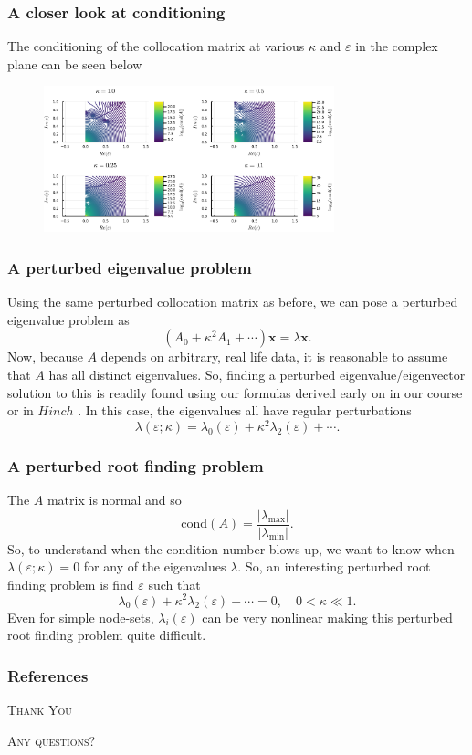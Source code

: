 \documentclass{cubeamer}
\newcommand{\eps}{\varepsilon}
\newcommand{\abs}[1]{\left| #1 \right|}
\begin{document}
\begin{frame}
	\frametitle{A closer look at conditioning}
	The conditioning of the collocation matrix at various $ \kappa $ and $ \eps $ in the complex plane can be seen below
	\begin{figure}
		\includegraphics[width = 0.75\textwidth]{Images/Conditioning.png}
	\end{figure}
\end{frame}

\begin{frame}
	\frametitle{A perturbed eigenvalue problem}
	Using the same perturbed collocation matrix as before, we can pose a perturbed eigenvalue problem as
	\[
		(A_0 + \kappa^2 A_1 + \cdots) \mathbf{x} = \lambda \mathbf{x}. 
	\]
	Now, because $ A $ depends on arbitrary, real life data, it is reasonable to assume that $ A $ has all distinct eigenvalues. So, finding a perturbed eigenvalue/eigenvector solution to this is readily found using our formulas derived early on in our course or in $ Hinch $ \cite{hinch}. In this case, the eigenvalues all have regular perturbations
	\[
		\lambda(\eps; \kappa) = \lambda_0(\eps) + \kappa^2 \lambda_2(\eps) + \cdots.
	\]
\end{frame}

\begin{frame}
	\frametitle{A perturbed root finding problem}
	The $ A $ matrix is normal and so
	\[
		\mathrm{cond}(A) = \frac{\abs{\lambda_{\max}}}{\abs{\lambda_{\min}}}.
	\]
	So, to understand when the condition number blows up, we want to know when $ \lambda(\eps; \kappa) = 0 $ for any of the eigenvalues $ \lambda $. So, an interesting perturbed root finding problem is find $ \eps $ such that
	\[
		\lambda_0(\eps) + \kappa^2 \lambda_2(\eps) + \cdots = 0, \quad 0 < \kappa \ll 1.
	\]
	Even  for simple node-sets, $ \lambda_i(\eps) $ can be very nonlinear making this perturbed root finding problem quite difficult.
	
\end{frame}

\begin{frame}
	\frametitle{References}
	
	
\end{frame}

\begin{frame}[standout]
    \Huge\textsc{Thank You}
    
    \vfill
    
    \LARGE\textsc{Any questions?}
\end{frame}
\end{document}
